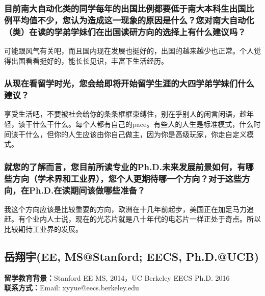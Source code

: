 \documentclass[a4paper,UTF8]{book}
\begin{document}
    \subsubsection*{目前南大自动化类的同学每年的出国比例都要低于南大本科生出国比例平均值不少，您认为造成这一现象的原因是什么？您对南大自动化（类）在读的学弟学妹们在出国读研方向的选择上有什么建议吗？}
    可能跟风气有关吧，而且国内现在发展也挺好的，出国的越来越少也正常。个人觉得出国看看挺好的，能长长见识，丰富下生活经历。
    
    \subsubsection*{从现在看留学时光，您会给即将开始留学生涯的大四学弟学妹们什么建议？}
    享受生活吧，不要被社会给你的条条框框束缚住，别在乎别人的闲言闲语，趁年轻，该干什么干什么。每个人都有自己的pace。有些人的人生是标准模式，什么时间该干什么，但你的人生应该由你自己做主，因为你是高级玩家，你走自定义模式。
    
    \subsubsection*{就您的了解而言，您目前所读专业的Ph.D.未来发展前景如何，有哪些方向（学术界和工业界），您个人更期待哪一个方向？对于这些方向，在Ph.D.在读期间该做哪些准备？}
    我这个方向应该是比较重要的方向，欧洲在十几年前起步，美国正在加足马力追赶。有个业内人士说，现在的光芯片就是八十年代的电芯片一样正处于奇点。所以比较期待工业界的发展。


\clearpage
\subsection{岳翔宇(EE, MS@Stanford; EECS, Ph.D.@UCB)}
    \textbf{留学教育背景：}Stanford EE MS, 2014，UC Berkeley EECS Ph.D. 2016\\
    \textbf{联系方式：}Email: xyyue@eecs.berkeley.edu
\end{document}
